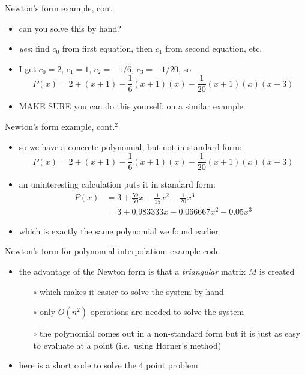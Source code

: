 \documentclass[10pt,hyperref]{beamer}
\newcommand{\MS}{\alert{MAKE SURE}\xspace}
\newcommand{\mfile}[1]{
\VerbatimInput[frame=single,label=\fbox{\scriptsize \textsl{\,#1\,}},fontfamily=courier,fontsize=\scriptsize]{#1}
}
\begin{document}
\begin{frame}{Newton's form example, cont.}

\begin{itemize}
\item can you solve this by hand?
\item \emph{yes}:  find $c_0$ from first equation, then $c_1$ from second equation, etc.
\item I get $c_0=2$, $c_1=1$, $c_2=-1/6$, $c_3=-1/20$,  so
	$$P(x) = 2 + (x+1) - \frac{1}{6} (x +1)(x) - \frac{1}{20} (x +1)(x) (x-3)$$
\item \MS you can do this yourself, on a similar example
\end{itemize}
\end{frame}


\begin{frame}{Newton's form example, $\text{cont.}^2$}

\begin{itemize}
\item so we have a concrete polynomial, but not in standard form:
	$$P(x) = 2 + (x+1) - \frac{1}{6} (x +1)(x) - \frac{1}{20} (x +1)(x) (x-3)$$
\item an uninteresting calculation puts it in standard form:
\begin{align*}
P(x) &= 3 + \frac{59}{60} x - \frac{1}{15} x^2 - \frac{1}{20} x^3 \\
     &= 3 + 0.983333 x - 0.066667 x^2 - 0.05 x^3
\end{align*}
\item which is exactly the same polynomial we found earlier
\end{itemize}
\end{frame}


\begin{frame}{Newton's form for polynomial interpolation: example code}

\begin{itemize}
\item the advantage of the Newton form is that a \emph{triangular} matrix $M$ is created
  \begin{itemize}
  \item[$\circ$] which makes it easier to solve the system by hand
  \item[$\circ$] only $O(n^2)$ operations are needed to solve the system
  \item[$\circ$] the polynomial comes out in a non-standard form but it is just as easy to evaluate at a point (i.e.~using Horner's method)
  \end{itemize}
\item here is a short code to solve the 4 point problem:
\bigskip

\mfile{newt4.m}
\end{itemize}
\end{frame}
\end{document}
